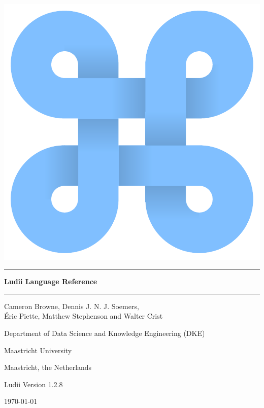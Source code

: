 \documentclass[10pt,twoside]{report}
\begin{document}
\texttt{\hyphenchar{} }

\thispagestyle{empty}

\begin{centering}

\includegraphics[scale=0.35]{figs/ludii-icon-1.pdf}


\vspace{30mm}
\noindent\rule{14.5cm}{0.5pt}

\vspace{5mm}
{\Huge \bf Ludii Language Reference}

\vspace{2mm}
\noindent\rule{14.5cm}{0.5pt}
 
 
\vspace{10mm}
{\Large Cameron Browne, Dennis J. N. J. Soemers,\\ {\'E}ric Piette, Matthew Stephenson and Walter Crist}

\vspace{10mm}
{\large Department of Data Science and Knowledge Engineering (DKE)}
 
\vspace{1mm}
{\large Maastricht University}

\vspace{1mm}
{\large Maastricht, the Netherlands}

\vspace{10mm}
{\large Ludii Version 1.2.8}

\vspace{1mm}
{\large \today}

\pagebreak

\end{centering}
\end{document}
